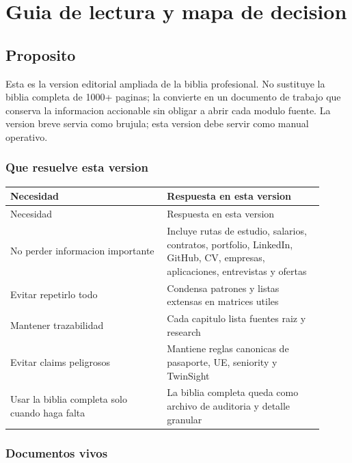 \chapter{Guia de lectura y mapa de decision}

\section{Proposito}


Esta es la version editorial ampliada de la biblia profesional. No sustituye la biblia completa de 1000+ paginas; la convierte en un documento de trabajo que conserva la informacion accionable sin obligar a abrir cada modulo fuente. La version breve servia como brujula; esta version debe servir como manual operativo.


\subsection{Que resuelve esta version}


\begin{center}
\scriptsize
\begin{longtable}{>{\raggedright\arraybackslash}p{0.455\linewidth} >{\raggedright\arraybackslash}p{0.455\linewidth}}
\toprule
Necesidad & Respuesta en esta version \\
\midrule
\endfirsthead
\toprule
Necesidad & Respuesta en esta version \\
\midrule
\endhead
No perder informacion importante & Incluye rutas de estudio, salarios, contratos, portfolio, LinkedIn, GitHub, CV, empresas, aplicaciones, entrevistas y ofertas \\
Evitar repetirlo todo & Condensa patrones y listas extensas en matrices utiles \\
Mantener trazabilidad & Cada capitulo lista fuentes raiz y research \\
Evitar claims peligrosos & Mantiene reglas canonicas de pasaporte, UE, seniority y TwinSight \\
Usar la biblia completa solo cuando haga falta & La biblia completa queda como archivo de auditoria y detalle granular \\
\bottomrule
\end{longtable}
\end{center}


\subsection{Documentos vivos}


